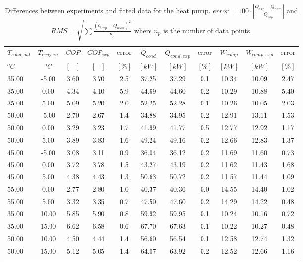 \documentclass[english]{SPFShortReport}
\begin{document}
\begin{table}[!ht]
\begin{small}
\caption{Differences between experiments and fitted data for the heat pump.          $error=100 \cdot |\frac{Q_{exp}-Q_{num}}{Q_{exp}}|$ and $RMS = \sqrt { \sum{\frac{(Q_{exp}-Q_{num})^2}{n_p}} }$ where $n_p$ is the number of data points.}
\begin{center}
\resizebox{12cm}{!} 
{
\begin{tabular}{l | c c c c c c c c c c } 
\hline
\hline
$T_{cond,out}$ &$T_{evap,in}$ &$COP$ &$COP_{exp}$ &error &$Q_{cond}$ &$Q_{cond,exp}$ &error &$W_{comp}$ &$W_{comp,exp}$ &error \\ 
$^oC$ &$^oC$ &$[-]$ &$[-]$ &$[\%]$ &$[kW]$ &$[kW]$ &$[\%]$ &$[kW]$ &$[kW]$ &$[\%]$\\ 
\hline
35.00  & -5.00 & 3.60 & 3.70 & 2.5 & 37.25 & 37.29 & 0.1 & 10.34 & 10.09 & 2.47\\ 
35.00  & 0.00 & 4.34 & 4.10 & 5.9 & 44.69 & 44.60 & 0.2 & 10.29 & 10.88 & 5.40\\ 
35.00  & 5.00 & 5.09 & 5.20 & 2.0 & 52.25 & 52.28 & 0.1 & 10.26 & 10.05 & 2.03\\ 
50.00  & -5.00 & 2.70 & 2.67 & 1.4 & 34.88 & 34.95 & 0.2 & 12.91 & 13.11 & 1.53\\ 
50.00  & 0.00 & 3.29 & 3.23 & 1.7 & 41.99 & 41.77 & 0.5 & 12.77 & 12.92 & 1.17\\ 
50.00  & 5.00 & 3.89 & 3.83 & 1.6 & 49.24 & 49.16 & 0.2 & 12.66 & 12.83 & 1.37\\ 
45.00  & -5.00 & 3.08 & 3.11 & 0.9 & 36.04 & 36.12 & 0.2 & 11.69 & 11.60 & 0.73\\ 
45.00  & 0.00 & 3.72 & 3.78 & 1.5 & 43.27 & 43.19 & 0.2 & 11.62 & 11.43 & 1.68\\ 
45.00  & 5.00 & 4.38 & 4.43 & 1.3 & 50.63 & 50.72 & 0.2 & 11.57 & 11.44 & 1.09\\ 
55.00  & 0.00 & 2.77 & 2.80 & 1.0 & 40.37 & 40.36 & 0.0 & 14.55 & 14.40 & 1.02\\ 
55.00  & 5.00 & 3.32 & 3.35 & 0.7 & 47.50 & 47.60 & 0.2 & 14.29 & 14.22 & 0.48\\ 
35.00  & 10.00 & 5.85 & 5.90 & 0.8 & 59.92 & 59.95 & 0.1 & 10.24 & 10.16 & 0.72\\ 
35.00  & 15.00 & 6.62 & 6.58 & 0.6 & 67.70 & 67.63 & 0.1 & 10.22 & 10.27 & 0.48\\ 
50.00  & 10.00 & 4.50 & 4.44 & 1.4 & 56.60 & 56.54 & 0.1 & 12.58 & 12.74 & 1.32\\ 
50.00  & 15.00 & 5.12 & 5.05 & 1.4 & 64.07 & 63.92 & 0.2 & 12.52 & 12.66 & 1.16\\ 

\end{tabular}}
\end{center}
\end{small}
\end{table}
\end{document}
